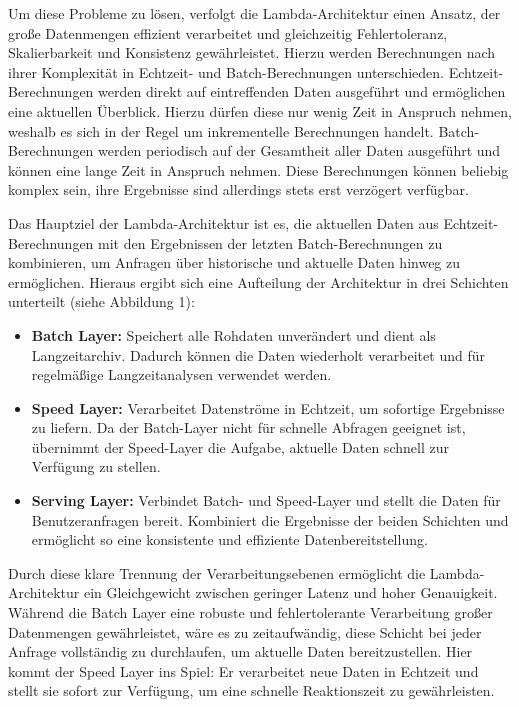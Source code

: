 Um diese Probleme zu lösen, verfolgt die Lambda-Architektur einen Ansatz, der große Datenmengen effizient verarbeitet und gleichzeitig Fehlertoleranz, Skalierbarkeit und Konsistenz gewährleistet.
Hierzu werden Berechnungen nach ihrer Komplexität in Echtzeit- und Batch-Berechnungen unterschieden.
Echtzeit-Berechnungen werden direkt auf eintreffenden Daten ausgeführt und ermöglichen eine aktuellen Überblick.
Hierzu dürfen diese nur wenig Zeit in Anspruch nehmen, weshalb es sich in der Regel um inkrementelle Berechnungen handelt.
Batch-Berechnungen werden periodisch auf der Gesamtheit aller Daten ausgeführt und können eine lange Zeit in Anspruch nehmen.
Diese Berechnungen können beliebig komplex sein, ihre Ergebnisse sind allerdings stets erst verzögert verfügbar.

Das Hauptziel der Lambda-Architektur ist es, 
die aktuellen Daten aus Echtzeit-Berechnungen mit den Ergebnissen der letzten Batch-Berechnungen zu kombinieren,
um Anfragen über historische und aktuelle Daten hinweg zu ermöglichen.
Hieraus ergibt sich eine Aufteilung der Architektur in drei Schichten unterteilt (siehe Abbildung 1):

\begin{itemize}
	\item \textbf{Batch Layer:} Speichert alle Rohdaten unverändert und dient als Langzeitarchiv. Dadurch können die Daten wiederholt verarbeitet und für regelmäßige Langzeitanalysen verwendet werden.
	\item \textbf{Speed Layer:} Verarbeitet Datenströme in Echtzeit, um sofortige Ergebnisse zu liefern. Da der Batch-Layer nicht für schnelle Abfragen geeignet ist, übernimmt der Speed-Layer die Aufgabe, aktuelle Daten schnell zur Verfügung zu stellen.
	\item \textbf{Serving Layer:} Verbindet Batch- und Speed-Layer und stellt die Daten für Benutzeranfragen bereit. Kombiniert die Ergebnisse der beiden Schichten und ermöglicht so eine konsistente und effiziente Datenbereitstellung.
\end{itemize}

Durch diese klare Trennung der Verarbeitungsebenen ermöglicht die Lambda-Architektur ein Gleichgewicht zwischen geringer Latenz und hoher Genauigkeit. Während die Batch Layer eine robuste und fehlertolerante Verarbeitung großer Datenmengen gewährleistet, wäre es zu zeitaufwändig, diese Schicht bei jeder Anfrage vollständig zu durchlaufen, um aktuelle Daten bereitzustellen. Hier kommt der Speed Layer ins Spiel: Er verarbeitet neue Daten in Echtzeit und stellt sie sofort zur Verfügung, um eine schnelle Reaktionszeit zu gewährleisten.

